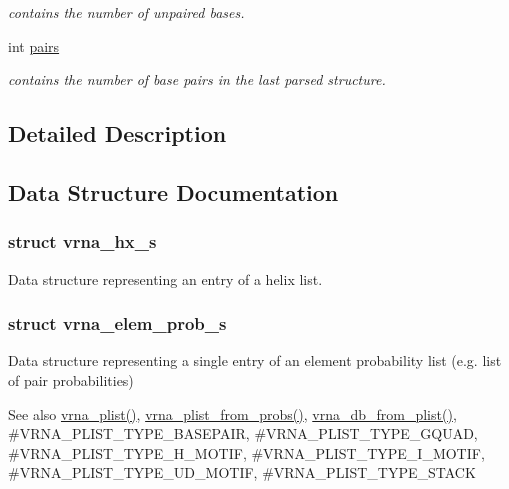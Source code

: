\begin{DoxyCompactItemize}
\begin{DoxyCompactList}\small\item\em contains the number of unpaired bases. \end{DoxyCompactList}\item 
\mbox{\label{group__struct__utils_ga6341cbb704924824e0236c1dce791032}} 
int \hyperlink{group__struct__utils_ga6341cbb704924824e0236c1dce791032}{pairs}
\begin{DoxyCompactList}\small\item\em contains the number of base pairs in the last parsed structure. \end{DoxyCompactList}\end{DoxyCompactItemize}


\subsection{Detailed Description}


\subsection{Data Structure Documentation}
\label{structvrna__hx__s}
\subsubsection{struct vrna\+\_\+hx\+\_\+s}
Data structure representing an entry of a helix list. \label{structvrna__elem__prob__s}
\subsubsection{struct vrna\+\_\+elem\+\_\+prob\+\_\+s}
Data structure representing a single entry of an element probability list (e.\+g. list of pair probabilities) 

\begin{DoxySeeAlso}{See also}
\hyperlink{group__struct__utils_gaf002d69024d709744664a8b9ca3dd77d}{vrna\+\_\+plist()}, \hyperlink{group__pf__fold_ga94f6efc0b8d8712b023452794a0a5bd2}{vrna\+\_\+plist\+\_\+from\+\_\+probs()}, \hyperlink{group__struct__utils_ga6a51a36b9245d0bac868c5cd172b9611}{vrna\+\_\+db\+\_\+from\+\_\+plist()}, \#\+V\+R\+N\+A\+\_\+\+P\+L\+I\+S\+T\+\_\+\+T\+Y\+P\+E\+\_\+\+B\+A\+S\+E\+P\+A\+IR, \#\+V\+R\+N\+A\+\_\+\+P\+L\+I\+S\+T\+\_\+\+T\+Y\+P\+E\+\_\+\+G\+Q\+U\+AD, \#\+V\+R\+N\+A\+\_\+\+P\+L\+I\+S\+T\+\_\+\+T\+Y\+P\+E\+\_\+\+H\+\_\+\+M\+O\+T\+IF, \#\+V\+R\+N\+A\+\_\+\+P\+L\+I\+S\+T\+\_\+\+T\+Y\+P\+E\+\_\+\+I\+\_\+\+M\+O\+T\+IF, \#\+V\+R\+N\+A\+\_\+\+P\+L\+I\+S\+T\+\_\+\+T\+Y\+P\+E\+\_\+\+U\+D\+\_\+\+M\+O\+T\+IF, \#\+V\+R\+N\+A\+\_\+\+P\+L\+I\+S\+T\+\_\+\+T\+Y\+P\+E\+\_\+\+S\+T\+A\+CK 
\end{DoxySeeAlso}


